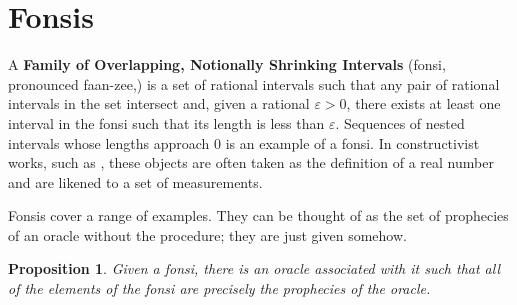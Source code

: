 \documentclass[12pt]{article}
\newtheorem{proposition}{Proposition}[section]
\begin{document}
\section{Fonsis}\label{os-fonsis}

 A \textbf{Family of Overlapping, Notionally Shrinking Intervals} (fonsi, pronounced faan-zee,) is a set of rational intervals such that any pair of rational intervals in the set intersect and, given a rational $\varepsilon >0$, there exists at least one interval in the fonsi such that its length is less than $\varepsilon$. Sequences of nested intervals whose lengths approach 0 is an example of a fonsi. In constructivist works, such as \cite{bridger}, these objects are often taken as the definition of a real number and are likened to a set of measurements. 

Fonsis cover a range of examples. They can be thought of as the set of prophecies of an oracle without the procedure; they are just given somehow. 

\begin{proposition}
    Given a fonsi, there is an oracle associated with it such that all of the elements of the fonsi are precisely the prophecies of the oracle. 
\end{proposition}
\end{document}
